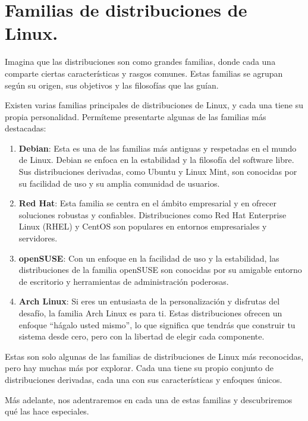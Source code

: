 \documentclass[
  letterpaper,
  DIV=11,
  numbers=noendperiod]{scrartcl}
\begin{document}
\hypertarget{familias-de-distribuciones-de-linux.}{%
\section{Familias de distribuciones de
Linux.}\label{familias-de-distribuciones-de-linux.}}

Imagina que las distribuciones son como grandes familias, donde cada una
comparte ciertas características y rasgos comunes. Estas familias se
agrupan según su origen, sus objetivos y las filosofías que las guían.

Existen varias familias principales de distribuciones de Linux, y cada
una tiene su propia personalidad. Permíteme presentarte algunas de las
familias más destacadas:

\begin{enumerate}
\def\labelenumi{\arabic{enumi}.}
\item
  \textbf{Debian}: Esta es una de las familias más antiguas y respetadas
  en el mundo de Linux. Debian se enfoca en la estabilidad y la
  filosofía del software libre. Sus distribuciones derivadas, como
  Ubuntu y Linux Mint, son conocidas por su facilidad de uso y su amplia
  comunidad de usuarios.
\item
  \textbf{Red Hat}: Esta familia se centra en el ámbito empresarial y en
  ofrecer soluciones robustas y confiables. Distribuciones como Red Hat
  Enterprise Linux (RHEL) y CentOS son populares en entornos
  empresariales y servidores.
\item
  \textbf{openSUSE}: Con un enfoque en la facilidad de uso y la
  estabilidad, las distribuciones de la familia openSUSE son conocidas
  por su amigable entorno de escritorio y herramientas de administración
  poderosas.
\item
  \textbf{Arch Linux}: Si eres un entusiasta de la personalización y
  disfrutas del desafío, la familia Arch Linux es para ti. Estas
  distribuciones ofrecen un enfoque ``hágalo usted mismo'', lo que
  significa que tendrás que construir tu sistema desde cero, pero con la
  libertad de elegir cada componente.
\end{enumerate}

Estas son solo algunas de las familias de distribuciones de Linux más
reconocidas, pero hay muchas más por explorar. Cada una tiene su propio
conjunto de distribuciones derivadas, cada una con sus características y
enfoques únicos.

Más adelante, nos adentraremos en cada una de estas familias y
descubriremos qué las hace especiales.
\end{document}
